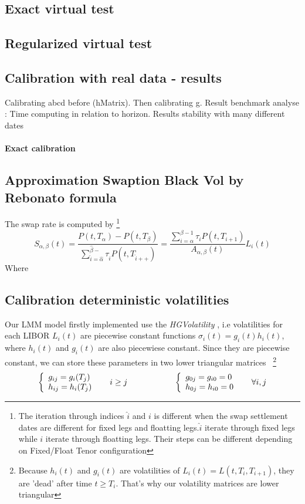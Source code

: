 \documentclass[a4paper,10pt]{article}
\newcommand{\Ptii}{P(t,T_{i+1})}
\newcommand{\Lit}{L_{i}(t)}
\begin{document}
\subsection{Exact virtual test}
\subsection{Regularized virtual test}
\subsection{Calibration with real data - results}
Calibrating abcd before (hMatrix). Then calibrating g. Result benchmark analyse : Time computing in relation to horizon. Results stability with many different dates
\paragraph{Exact calibration}

\subsection{Approximation Swaption Black Vol by Rebonato formula}
The swap rate is computed by \footnote{The iteration through indices $\hat{i}$ and $i$ is different when the swap settlement dates are different for fixed legs and floatting legs.$\hat{i}$ iterate through fixed legs while $i$ iterate through floatting legs. Their steps can be different depending on Fixed/Float Tenor configuration}
\[
S_{\alpha,\beta}(t) 
= 
\frac{P(t,T_{\alpha})-P(t,T_{\beta})}{\sum^{\hat{\beta}-}_{\hat{i}=\hat{\alpha}}\tau_{\hat{i}}P(t,T_{\hat{i}++})} 
=
\frac{\sum^{\beta-1}_{i=\alpha} \tau_i \Ptii }{A_{\alpha,\beta}(t)} \Lit 
\]
Where 
\subsection{Calibration deterministic volatilities}
Our LMM model firstly implemented use the \textit{HGVolatility} , i.e volatilities for each LIBOR $L_i(t)$ are piecewise constant functions $\sigma_i(t)=g_i(t)h_i(t)$, where $h_i(t)$ and $g_i(t)$ are also piecewiese constant. Since they are piecewise constant, we can store these parameters in two lower triangular matrices ~\footnote{ Because $h_i(t)$ and $g_i(t)$ are volatilities of $L_i(t)=L(t,T_i,T_{i+1}) $, they are 'dead' after time $t \geq T_i$. That's why our volatility matrices are lower triangular}
\[
\left\{
\begin{array}{l}
g_{ij}= g_i(T_j) \\
h_{ij}= h_i(T_j)
\end{array}
\right.
\hspace{0.5cm}
i \geq j
\hspace{2cm}
\left\{
\begin{array}{l}
g_{0j}=g_{i0}=0 \\
h_{0j}=h_{i0}=0
\end{array}
\right.
\hspace{0.5cm}
\forall i,j
\]
\end{document}
